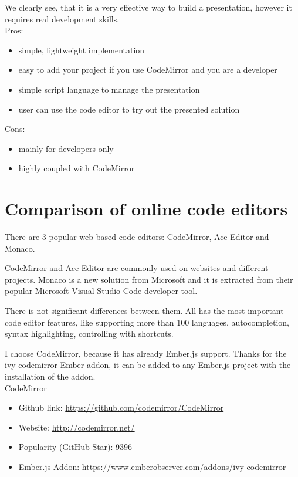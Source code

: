 \documentclass[11pt, a4paper, twoside, openright]{report}
\begin{document}
We clearly see, that it is a very effective way to build a presentation, however it requires real development skills.\\

\noindent Pros:
\begin{itemize}[noitemsep]
\item simple, lightweight implementation
\item easy to add your project if you use CodeMirror and you are a developer
\item simple script language to manage the presentation
\item user can use the code editor to try out the presented solution
\end{itemize}
Cons:
\begin{itemize}[noitemsep]
\item mainly for developers only
\item highly coupled with CodeMirror
\end{itemize}


\section{Comparison of online code editors}

There are 3 popular web based code editors: CodeMirror, Ace Editor and Monaco.

CodeMirror and Ace Editor are commonly used on websites and different projects. Monaco is a new solution from Microsoft and it is extracted from their popular Microsoft Visual Studio Code developer tool.

There is not significant differences between them. All has the most important code editor features, like supporting more than 100 languages, autocompletion, syntax highlighting, controlling with shortcuts.

I choose CodeMirror, because it has already Ember.js support. Thanks for the ivy-codemirror Ember addon, it can be added to any Ember.js project with the installation of the addon. \\

\noindent CodeMirror
\begin{itemize}[noitemsep]
\item Github link: \url{https://github.com/codemirror/CodeMirror}
\item Website: \url{http://codemirror.net/}
\item Popularity (GitHub Star): 9396
\item Ember.js Addon: \url{https://www.emberobserver.com/addons/ivy-codemirror} \\
\end{itemize}
\end{document}
